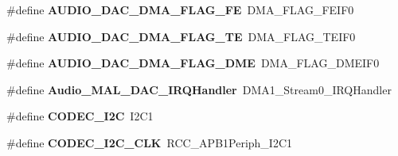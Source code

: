 \begin{DoxyCompactItemize}
\item 
\hypertarget{group___s_t_m32_f4___d_i_s_c_o_v_e_r_y___a_u_d_i_o___c_o_d_e_c___exported___constants_gabd741e589b8b84c09d380fd3a6942987}{\#define {\bfseries A\-U\-D\-I\-O\-\_\-\-D\-A\-C\-\_\-\-D\-M\-A\-\_\-\-F\-L\-A\-G\-\_\-\-F\-E}~D\-M\-A\-\_\-\-F\-L\-A\-G\-\_\-\-F\-E\-I\-F0}\label{group___s_t_m32_f4___d_i_s_c_o_v_e_r_y___a_u_d_i_o___c_o_d_e_c___exported___constants_gabd741e589b8b84c09d380fd3a6942987}

\item 
\hypertarget{group___s_t_m32_f4___d_i_s_c_o_v_e_r_y___a_u_d_i_o___c_o_d_e_c___exported___constants_ga73fbbacdd3446d27ce72335498a41810}{\#define {\bfseries A\-U\-D\-I\-O\-\_\-\-D\-A\-C\-\_\-\-D\-M\-A\-\_\-\-F\-L\-A\-G\-\_\-\-T\-E}~D\-M\-A\-\_\-\-F\-L\-A\-G\-\_\-\-T\-E\-I\-F0}\label{group___s_t_m32_f4___d_i_s_c_o_v_e_r_y___a_u_d_i_o___c_o_d_e_c___exported___constants_ga73fbbacdd3446d27ce72335498a41810}

\item 
\hypertarget{group___s_t_m32_f4___d_i_s_c_o_v_e_r_y___a_u_d_i_o___c_o_d_e_c___exported___constants_ga60b1551618744e295f60b0878df10cd4}{\#define {\bfseries A\-U\-D\-I\-O\-\_\-\-D\-A\-C\-\_\-\-D\-M\-A\-\_\-\-F\-L\-A\-G\-\_\-\-D\-M\-E}~D\-M\-A\-\_\-\-F\-L\-A\-G\-\_\-\-D\-M\-E\-I\-F0}\label{group___s_t_m32_f4___d_i_s_c_o_v_e_r_y___a_u_d_i_o___c_o_d_e_c___exported___constants_ga60b1551618744e295f60b0878df10cd4}

\item 
\hypertarget{group___s_t_m32_f4___d_i_s_c_o_v_e_r_y___a_u_d_i_o___c_o_d_e_c___exported___constants_gaf0b5c30927f7245c60a248e7b8ce57d9}{\#define {\bfseries Audio\-\_\-\-M\-A\-L\-\_\-\-D\-A\-C\-\_\-\-I\-R\-Q\-Handler}~D\-M\-A1\-\_\-\-Stream0\-\_\-\-I\-R\-Q\-Handler}\label{group___s_t_m32_f4___d_i_s_c_o_v_e_r_y___a_u_d_i_o___c_o_d_e_c___exported___constants_gaf0b5c30927f7245c60a248e7b8ce57d9}

\item 
\hypertarget{group___s_t_m32_f4___d_i_s_c_o_v_e_r_y___a_u_d_i_o___c_o_d_e_c___exported___constants_ga2aedc8425f8c37624a6d80b93ee94590}{\#define {\bfseries C\-O\-D\-E\-C\-\_\-\-I2\-C}~I2\-C1}\label{group___s_t_m32_f4___d_i_s_c_o_v_e_r_y___a_u_d_i_o___c_o_d_e_c___exported___constants_ga2aedc8425f8c37624a6d80b93ee94590}

\item 
\hypertarget{group___s_t_m32_f4___d_i_s_c_o_v_e_r_y___a_u_d_i_o___c_o_d_e_c___exported___constants_ga992585a8a81618fce30d54784116cc81}{\#define {\bfseries C\-O\-D\-E\-C\-\_\-\-I2\-C\-\_\-\-C\-L\-K}~R\-C\-C\-\_\-\-A\-P\-B1\-Periph\-\_\-\-I2\-C1}\label{group___s_t_m32_f4___d_i_s_c_o_v_e_r_y___a_u_d_i_o___c_o_d_e_c___exported___constants_ga992585a8a81618fce30d54784116cc81}


\end{DoxyCompactItemize}
